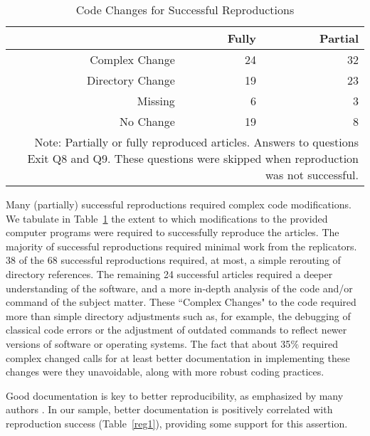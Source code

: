 \documentclass{cje} %
\theoremstyle{plain}%
\theoremstyle{definition}
\theoremstyle{remark}
\begin{document}
\begin{table}
\centering
\caption{Code Changes for Successful Reproductions} 
\label{tab:code}
\begin{tabular}{rrr}
  \\ \hline
 & Fully & Partial \\ 
  \hline
Complex Change &  24 &  32 \\ 
  Directory Change &  19 &  23 \\ 
  Missing &   6 &   3 \\ 
  No Change &  19 &   8 \\ 
   \hline\multicolumn{3}{p{0.8\textwidth}}{\footnotesize{ Note: Partially or fully reproduced articles.
                   Answers to questions Exit Q8 and Q9. These questions were skipped when
                   reproduction was not successful.}}\\ \hline
\end{tabular}
\end{table}

Many (partially) successful reproductions required complex code modifications. We tabulate in Table~\ref{tab:code} the extent to which modifications to the provided computer programs were required to successfully reproduce the articles. The majority of successful reproductions required minimal work from the replicators. 38 of the 68 successful reproductions required, at most, a simple rerouting of directory references. The remaining 24 successful articles required a deeper understanding of the software, and a more in-depth analysis of the code and/or command of the subject matter. These ``Complex Changes" to the code required more than simple directory adjustments such as, for example, the debugging of classical code errors or the adjustment of outdated commands to reflect newer versions of software or operating systems. The fact that about 35$\%$ required complex changed calls for at least better documentation in implementing these changes were they unavoidable, along with more robust coding practices.


\FloatBarrier
Good documentation is key to better reproducibility, as emphasized by many authors \citep{McCullough2006, ChangLi2015,Stark2018}. In our sample,  better documentation is positively correlated with reproduction success (Table~\ref{reg1}), providing some support for this assertion.
\end{document}
